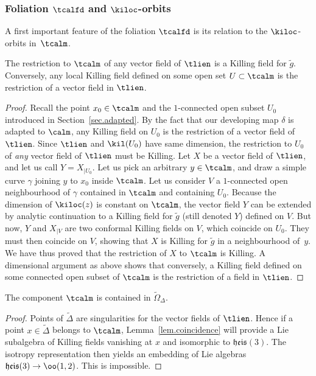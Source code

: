 \subsubsection{Foliation \texorpdfstring{$\tcalfd$}{tcalfd} and \texorpdfstring{$\kiloc$}{kiloc}-orbits}\label{sec.folorbits}
A first important feature of the foliation $\tcalfd$ is its relation to the $\kiloc$-orbits in~$\tcalm$.


\begin{lemm}\label{lem.coincidence}
The restriction to $\tcalm$ of any vector field of $\tlien$ is a Killing field for $\tilde{g}$. Conversely, any local Killing field defined on some open set $U \subset \tcalm$ is the restriction of a vector field in $\tlien$.
\end{lemm}

\begin{proof}
Recall the point $x_0 \in \tcalm$ and the $1$-connected open subset $U_0$ introduced in Section~\ref{sec.adapted}. By the fact that our developing map $\delta$ is adapted to $\calm$, any Killing field on $U_0$ is the restriction of a vector field of $\tlien$. Since $\tlien$ and $\kil(U_0)$ have same dimension, the restriction to $U_0$ of \emph{any} vector field of $ \tlien$ must be Killing. Let $X$ be a vector field of $\tlien$, and let us call $Y=X_{|U_0}$. Let us pick an arbitrary $y \in \tcalm$, and draw a simple curve $\gamma$ joining $y$ to $x_0$ inside $\tcalm$. Let us consider $V$ a \linebreak$1$-connected open neighbourhood of $\gamma$ contained in $\tcalm$ and containing $U_0$. Because the dimension of $\kiloc(z)$ is constant on $\tcalm$, the vector field $Y$ can be extended by analytic continuation to a Killing field for $\tilde{g}$ (still denoted $Y$) defined on $V$. But now, $Y$ and $X_{|V}$ are two conformal Killing fields on $V$, which coincide on $U_0$. They must then coincide on $V$, showing that $X$ is Killing for $\tilde{g}$ in a neighbourhood of~$y$. We have thus proved that the restriction of $X$ to $\tcalm$ is Killing. A dimensional argument as above shows that conversely, a Killing field defined on some connected open subset of $\tcalm$ is the restriction of a field in $\tlien$.
\end{proof}


\begin{coro}\label{coro.nonsingulier}
The component $\tcalm$ is contained in $\tilde{\Omega}_{\Delta}$.
\end{coro}

\begin{proof}
Points of $\tilde{\Delta}$ are singularities for the vector fields of $\tlien$. Hence if a point $x \in \tilde{\Delta}$ belongs to $\tcalm$, Lemma~\ref{lem.coincidence} will provide a Lie subalgebra of Killing fields vanishing at $x$ and isomorphic to ${\mathfrak{heis}}(3)$. The isotropy representation then yields an embedding of Lie algebras ${\mathfrak{heis}}(3) \to \oo(1,2)$. This is impossible.
\end{proof}


